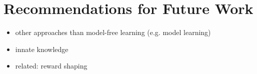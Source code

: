 \chapter{Recommendations for Future Work}
\begin{itemize}
    \item other approaches than model-free learning (e.g. model learning)
    \item innate knowledge
    \item related: reward shaping
\end{itemize}